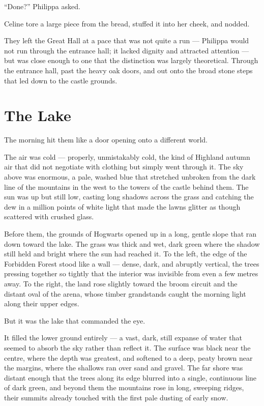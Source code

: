 \enquote{Done?} Philippa asked.

Celine tore a large piece from the bread, stuffed it into her cheek, and nodded.

They left the Great Hall at a pace that was not quite a run --- Philippa would not run through the entrance hall; it lacked dignity and attracted attention --- but was close enough to one that the distinction was largely theoretical. Through the entrance hall, past the heavy oak doors, and out onto the broad stone steps that led down to the castle grounds.

\section*{The Lake}
 
The morning hit them like a door opening onto a different world.
 
The air was cold --- properly, unmistakably cold, the kind of Highland autumn air that did not negotiate with clothing but simply went through it. The sky above was enormous, a pale, washed blue that stretched unbroken from the dark line of the mountains in the west to the towers of the castle behind them. The sun was up but still low, casting long shadows across the grass and catching the dew in a million points of white light that made the lawns glitter as though scattered with crushed glass.
 
Before them, the grounds of Hogwarts opened up in a long, gentle slope that ran down toward the lake. The grass was thick and wet, dark green where the shadow still held and bright where the sun had reached it. To the left, the edge of the Forbidden Forest stood like a wall --- dense, dark, and abruptly vertical, the trees pressing together so tightly that the interior was invisible from even a few metres away. To the right, the land rose slightly toward the broom circuit and the distant oval of the arena, whose timber grandstands caught the morning light along their upper edges.
 
But it was the lake that commanded the eye.
 
It filled the lower ground entirely --- a vast, dark, still expanse of water that seemed to absorb the sky rather than reflect it. The surface was black near the centre, where the depth was greatest, and softened to a deep, peaty brown near the margins, where the shallows ran over sand and gravel. The far shore was distant enough that the trees along its edge blurred into a single, continuous line of dark green, and beyond them the mountains rose in long, sweeping ridges, their summits already touched with the first pale dusting of early snow.
 
